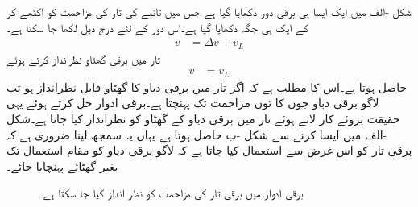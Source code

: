 شکل -الف میں ایک ایسا ہی برقی دور دکھایا گیا ہے جس  میں تانبے کی تار کی مزاحمت کو اکٹھے کر کے ایک ہی جگہ   دکھایا گیا ہے۔اس دور کے لئے درج ذیل لکھا جا سکتا ہے۔
\begin{align}
v&=\Delta v+v_L
\end{align}
تار میں برقی گھٹاو  نظرانداز کرتے ہوئے
\begin{align}
v&=v_L
\end{align}
حاصل ہوتا ہے۔اس کا مطلب ہے کہ اگر تار میں برقی دباو کا گھٹاو قابل نظرانداز ہو تب لاگو برقی دباو جوں کا توں مزاحمت  تک پہنچتا ہے۔برقی ادوار حل کرتے ہوئے یہی حقیقت بروئے کار لاتے ہوئے تار میں برقی دباو کے گھٹاو کو نظرانداز کیا جاتا ہے۔شکل -الف میں ایسا کرنے سے  شکل -ب حاصل ہوتا ہے۔یہاں یہ سمجھ لینا ضروری ہے کہ برقی تار کو اس غرض سے استعمال کیا جاتا ہے کہ لاگو برقی دباو کو مقام استعمال تک بغیر گھٹائے پہنچایا جائے۔
\begin{figure}
\centering
\begin{subfigure}[b]{0.45\textwidth}
\centering
{}%
\caption{}
\end{subfigure}\hfill
\begin{subfigure}[b]{0.45\textwidth}
\centering
{}%
\caption{}
\end{subfigure}%
\caption{برقی ادوار میں برقی تار کی مزاحمت کو نظر انداز کیا جا سکتا ہے۔}
\label{شکل_مقناطیسی_دور_سلسہ_وار_مزاحمتی_ادوار}
\end{figure}%
